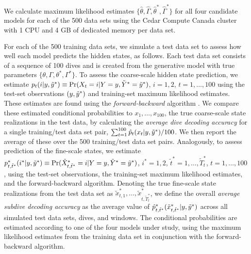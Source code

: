 We calculate maximum likelihood estimates $\{\hat \theta, \hat \Gamma, \hat \theta^*, \hat \Gamma^*\}$ for all four candidate models for each of the 500 data sets using the Cedar Compute Canada cluster with 1 CPU and 4 GB of dedicated memory per data set.

For each of the 500 training data sets, we simulate a test data set to assess how well each model predicts the hidden states, as follows.
Each test data set consists of a sequence of 100 dives and is created from the generative model with true parameters $\{\theta, \Gamma, \theta^*, \Gamma^*\}$.
To assess the coarse-scale hidden state prediction, we estimate $p_t(i|y,\tilde{y}^*) \equiv \Pr(X_t=i|Y=y,\tilde{Y}^*=\tilde{y}^*)$, $i=1,2$, $t=1,\ldots,100$ using the test-set observations $(y,\tilde{y}^*)$ and training-set maximum likelihood estimates. These estimates are found using the {\em{forward-backward}} algorithm \citep{Zucchini:2016}. We compare these estimated conditional probabilities to $x_1,\ldots,x_{100}$, the true coarse-scale state realizations in the test data, by calculating the {\em{average dive decoding accuracy}} for a single training/test data set pair, $\sum_{t=1}^{100} \hat{p}_t(x_t|y,\tilde{y}^*)/100$. We then report the average of these over the 500 training/test data set pairs. 
Analogously, to assess prediction of the fine-scale states, we estimate $p^*_{t,\tilde t^*}(i^*|y,\tilde{y}^*) \equiv \Pr(\tilde X^*_{t,\tilde t^*}=i|Y=y,\tilde{Y}^*=\tilde{y}^*)$, $i^*=1,2$, $\tilde t^* = 1,\ldots,\tilde T^*_t$, $t=1,\ldots,100$, using the test-set observations, the training-set maximum likelihood estimates, and the forward-backward algorithm. Denoting the true fine-scale state realizations from the test data set as $\tilde x^*_{t,1},\ldots,\tilde x^*_{t,\tilde T^*_t}$, we define the overall \textit{average subdive decoding accuracy} as the average value of $\hat{p}^*_{t,\tilde t^*}(\tilde x^*_{t,\tilde t^*}|y,\tilde{y}^*)$ across all simulated test data sets, dives, and windows. The conditional probabilities are estimated according to one of the four models under study, using the maximum likelihood estimates from the training data set in conjunction with the forward-backward algorithm.

